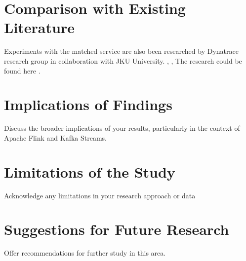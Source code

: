 \section{Comparison with Existing Literature}\label{sec:comparison-with-existing-literature}
Experiments with the matched service are also been researched by Dynatrace research
group in collaboration with JKU University. \cite{kleppmann2017}, \cite{kafka2020}, \cite{confluent2023}
The research could be found here \cite{ICPE2024}.

\section{Implications of Findings}\label{sec:implications-of-findings}
Discuss the broader implications of your results, particularly in the context of Apache Flink and Kafka Streams.

\section{Limitations of the Study}\label{sec:limitations-of-the-study}
Acknowledge any limitations in your research approach or data

\section{Suggestions for Future Research}\label{sec:suggestions-for-future-research}
Offer recommendations for further study in this area.